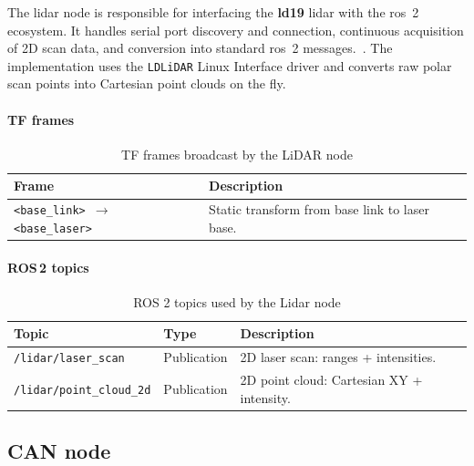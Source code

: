 The \gls{lidar} node is responsible for interfacing the \textbf{ld19} \gls{lidar} with the \gls{ros}~2 ecosystem. It handles serial port discovery and connection, continuous acquisition of 2D scan data, and conversion into standard \gls{ros}~2 messages.~\cite{ldlidar}. The implementation uses the \texttt{LDLiDAR} Linux Interface driver and converts raw polar scan points into Cartesian point clouds on the fly.

\paragraph*{TF frames}

\begin{table}[H]
  \centering
  \begin{tabular}{ll}
    \toprule
    \textbf{Frame}                                    & \textbf{Description}                           \\
    \midrule
    \texttt{<base\_link> $\rightarrow$ <base\_laser>} & Static transform from base link to laser base. \\
    \bottomrule
  \end{tabular}
  \caption{TF frames broadcast by the LiDAR node}
  \label{tab:ldlidar-tf-frames}
\end{table}

\paragraph*{ROS\,2 topics}
\begin{table}[H]
  \centering
  \begin{tabular}{lll}
    \toprule
    \textbf{Topic}                   & \textbf{Type}                             & \textbf{Description} \\
    \midrule
    \texttt{/lidar/laser\_scan}      & Publication
                                     & 2D laser scan: ranges + intensities.                           \\
    \texttt{/lidar/point\_cloud\_2d} & Publication
                                     & 2D point cloud: Cartesian XY + intensity.                      \\
    \bottomrule
  \end{tabular}
  \caption{ROS 2 topics used by the Lidar node}
  \label{tab:ldlidar-topics}
\end{table}


\subsection{CAN node}

